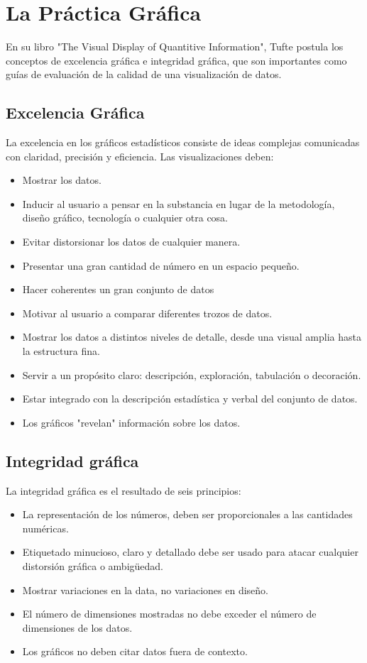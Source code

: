\section{La Práctica Gráfica}

En su libro "The Visual Display of Quantitive Information", Tufte \cite{Tuf83} postula los conceptos de excelencia gráfica e integridad gráfica, que son importantes como guías de evaluación de la calidad de una visualización de datos.

\subsection{Excelencia Gráfica}

La excelencia en los gráficos estadísticos consiste de ideas complejas comunicadas con claridad, precisión y eficiencia. Las visualizaciones deben:

\begin{itemize}
  \item Mostrar los datos.
  \item Inducir al usuario a pensar en la substancia en lugar de la metodología, diseño gráfico, tecnología o cualquier otra cosa.
  \item Evitar distorsionar los datos de cualquier manera.
  \item Presentar una gran cantidad de número en un espacio pequeño.
  \item Hacer coherentes un gran conjunto de datos
  \item Motivar al usuario a comparar diferentes trozos de datos.
  \item Mostrar los datos a distintos niveles de detalle, desde una visual amplia hasta la estructura fina.
  \item Servir a un propósito claro: descripción, exploración, tabulación o decoración.
  \item Estar integrado con la descripción estadística y verbal del conjunto de datos.
  \item Los gráficos "revelan" información sobre los datos.
\end{itemize}

\subsection{Integridad gráfica}

La integridad gráfica es el resultado de seis principios:

\begin{itemize}
  \item La representación de los números, deben ser proporcionales a las cantidades numéricas.
  \item Etiquetado minucioso, claro y detallado debe ser usado para atacar cualquier distorsión gráfica o ambigüedad.
  \item Mostrar variaciones en la data, no variaciones en diseño.
  \item El número de dimensiones mostradas no debe exceder el número de dimensiones de los datos.
  \item Los gráficos no deben citar datos fuera de contexto.
\end{itemize}
